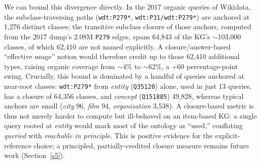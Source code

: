 \documentclass[sw]{iosart2x}
\begin{document}
We can bound this divergence directly. In the 2017 organic queries of Wikidata, the subclass-traversing paths (\texttt{wdt:P279*}, \texttt{wdt:P31/wdt:P279*}) are anchored at 1,276 distinct classes; the transitive subclass closure of those anchors, computed from the 2017 dump's 2.08M \texttt{P279} edges, spans 64,843 of the KG's $\sim$103,000 classes, of which 62,410 are not named explicitly. A closure/answer-based ``effective usage'' notion would therefore credit up to those 62,410 additional types, raising organic coverage from $\sim$4\% to $\sim$62\%, a $+60$ percentage-point swing. Crucially, this bound is dominated by a handful of queries anchored at near-root classes: \texttt{wdt:P279*} from \emph{entity} (\texttt{Q35120}) alone, used in just 13 queries, has a closure of 64,356 classes, and \emph{concept} (\texttt{Q151885}) 49,828, whereas typical anchors are small (\emph{city} 96, \emph{film} 94, \emph{organization} 3,538). A closure-based metric is thus not merely harder to compute but ill-behaved on an item-based KG: a single query rooted at \emph{entity} would mark most of the ontology as ``used,'' conflating \emph{queried} with \emph{reachable in principle}. This is positive evidence for the explicit-reference choice; a principled, partially-credited closure measure remains future work (Section~\ref{s5}).

\end{document}
